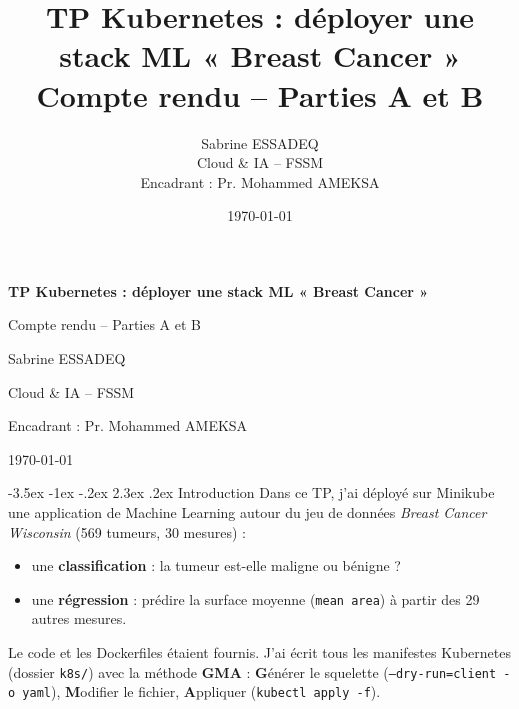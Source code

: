 \documentclass[11pt,a4paper]{article}
\title{\textbf{TP Kubernetes : déployer une stack ML « Breast Cancer »}\\[0.4em]
\large Compte rendu -- Parties A et B}
\author{Sabrine ESSADEQ\\ Cloud \& IA -- FSSM\\ Encadrant : Pr. Mohammed AMEKSA}
\date{\today}
\makeatletter
\renewcommand\section{\@startsection{section}{1}{\z@}%
  {-3.5ex \@plus -1ex \@minus -.2ex}%
  {2.3ex \@plus.2ex}%
  {\normalfont\Large\bfseries\color{titreRouge}}}
\makeatother
\begin{document}
\begin{titlepage}
  \centering
  \vspace*{3.5cm}
  {\LARGE\bfseries TP Kubernetes : déployer une stack ML « Breast Cancer »\par}
  \vspace{1.2cm}
  {\Large Compte rendu -- Parties A et B\par}
  \vspace{2.5cm}
  {\large Sabrine ESSADEQ\par}
  \vspace{0.6cm}
  {\large Cloud \& IA -- FSSM\par}
  \vspace{0.4cm}
  {\large Encadrant : Pr. Mohammed AMEKSA\par}
  \vfill
  {\large \today\par}
\end{titlepage}

\tableofcontents
\newpage

\section{Introduction}
Dans ce TP, j'ai déployé sur Minikube une application de Machine Learning
autour du jeu de données \emph{Breast Cancer Wisconsin} (569 tumeurs, 30 mesures) :
\begin{itemize}
  \item une \textbf{classification} : la tumeur est-elle maligne ou bénigne ?
  \item une \textbf{régression} : prédire la surface moyenne (\texttt{mean area}) à partir des 29 autres mesures.
\end{itemize}

Le code et les Dockerfiles étaient fournis. J'ai écrit tous les manifestes
Kubernetes (dossier \texttt{k8s/}) avec la méthode \textbf{GMA} :
\textbf{G}énérer le squelette (\texttt{--dry-run=client -o yaml}),
\textbf{M}odifier le fichier, \textbf{A}ppliquer (\texttt{kubectl apply -f}).
\end{document}
